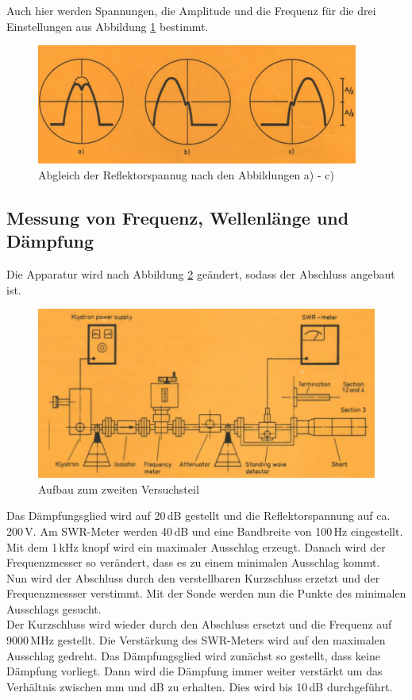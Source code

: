     Auch hier werden Spannungen, die Amplitude und die Frequenz für die drei Einstellungen aus Abbildung \ref{fig:Mode2}
    bestimmt.
    \begin{figure}
      \centering
      \includegraphics[scale = 0.8]{pictures/Mode2.png}
      \caption{Abgleich der Reflektorspannug nach den Abbildungen a) - c)\cite{anleitung}}
      \label{fig:Mode2}
    \end{figure}

    \subsection{Messung von Frequenz, Wellenlänge und Dämpfung}
    Die Apparatur wird nach Abbildung \ref{fig:aufbauv2} geändert, sodass der Abschluss angebaut ist.
    \begin{figure}
      \centering
      \includegraphics[scale=0.8]{pictures/AufbauV2.png}
      \caption{Aufbau zum zweiten Versuchsteil\cite{anleitung}}
      \label{fig:aufbauv2}
    \end{figure}
    Das Dämpfungsglied wird auf 20\,dB gestellt und die Reflektorspannung auf ca. 200\,V.
    Am SWR-Meter werden 40\,dB und eine Bandbreite von 100\,Hz eingestellt.
    Mit dem 1\,kHz knopf wird ein maximaler Ausschlag erzeugt.
    Danach wird der Frequenzmesser so verändert, dass es zu einem minimalen Ausschlag kommt.\\
    Nun wird der Abschluss durch den verstellbaren Kurzschluss erzetzt und der Frequenzmessser verstimmt.
    Mit der Sonde werden nun die Punkte des minimalen Ausschlags gesucht.\\
    Der Kurzschluss wird wieder durch den Abschluss ersetzt und die Frequenz auf 9000\,MHz gestellt.
    Die Verstärkung des SWR-Meters wird auf den maximalen Ausschlag gedreht.
    Das Dämpfungsglied wird zunächst so gestellt, dass keine Dämpfung vorliegt.
    Dann wird die Dämpfung immer weiter verstärkt um das Verhältnis zwischen mm und dB zu erhalten.
    Dies wird bis 10\,dB durchgeführt.

